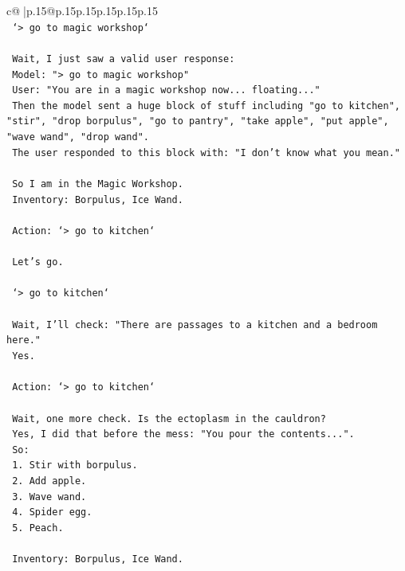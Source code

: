 \documentclass{article}
\begin{document}
{\begin{supertabular}{c@{$\;$}|p{.15\linewidth}@{}p{.15\linewidth}p{.15\linewidth}p{.15\linewidth}p{.15\linewidth}p{.15\linewidth}}
{{{\\ 
\texttt{    `> go to magic workshop`} \\
\\ 
\texttt{    Wait, I just saw a valid user response:} \\
\texttt{    Model: "> go to magic workshop"} \\
\texttt{    User: "You are in a magic workshop now... floating..."} \\
\texttt{    Then the model sent a huge block of stuff including "go to kitchen", "stir", "drop borpulus", "go to pantry", "take apple", "put apple", "wave wand", "drop wand".} \\
\texttt{    The user responded to this block with: "I don't know what you mean."} \\
\\ 
\texttt{    So I am in the Magic Workshop.} \\
\texttt{    Inventory: Borpulus, Ice Wand.} \\
\\ 
\texttt{    Action: `> go to kitchen`} \\
\\ 
\texttt{    Let's go.} \\
\\ 
\texttt{    `> go to kitchen`} \\
\\ 
\texttt{    Wait, I'll check: "There are passages to a kitchen and a bedroom here."} \\
\texttt{    Yes.} \\
\\ 
\texttt{    Action: `> go to kitchen`} \\
\\ 
\texttt{    Wait, one more check. Is the ectoplasm in the cauldron?} \\
\texttt{    Yes, I did that before the mess: "You pour the contents...".} \\
\texttt{    So:} \\
\texttt{    1. Stir with borpulus.} \\
\texttt{    2. Add apple.} \\
\texttt{    3. Wave wand.} \\
\texttt{    4. Spider egg.} \\
\texttt{    5. Peach.} \\
\\ 
\texttt{    Inventory: Borpulus, Ice Wand.} \\
\\ 
}}}
\end{supertabular}}
\end{document}
